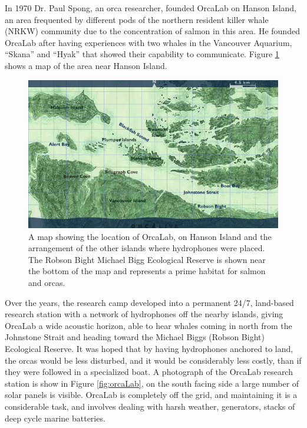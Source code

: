 \documentclass[12pt,oneside]{book}
\begin{document}
In 1970 Dr. Paul Spong, an orca researcher, founded OrcaLab on Hanson
Island, an area frequented by different pods of the northern resident
killer whale (NRKW) community due to the concentration of salmon in
this area.  He founded OrcaLab after having experiences with two
whales in the Vancouver Aquarium, ``Skana'' and ``Hyak'' that showed
their capability to communicate. Figure \ref{fig:orcalabMap} shows a
map of the area near Hanson Island.

\begin{figure}[t]
\centering
\includegraphics[width=\columnwidth]{figures/orcalabMap}
\caption{A map showing the location of OrcaLab, on Hanson Island and
  the arrangement of the other islands where hydrophones were placed.
  The Robson Bight Michael Bigg Ecological Reserve is shown near the
  bottom of the map and represents a prime habitat for salmon and
  orcas.}
\label{fig:orcalabMap}
\end{figure}

Over the years, the research camp developed into a permanent 24/7,
land-based research station with a network of hydrophones off the
nearby islands, giving OrcaLab a wide acoustic horizon, able to hear
whales coming in north from the Johnstone Strait and heading toward
the Michael Biggs (Robson Bight) Ecological Reserve.  It was hoped
that by having hydrophones anchored to land, the orcas would be less
disturbed, and it would be considerably less costly, than if they were
followed in a specialized boat.  A photograph of the OrcaLab research
station is show in Figure \ref{fig:orcaLab}, on the south facing side
a large number of solar panels is visible.  OrcaLab is completely off
the grid, and maintaining it is a considerable task, and involves
dealing with harsh weather, generators, stacks of deep cycle marine
batteries.
\end{document}
